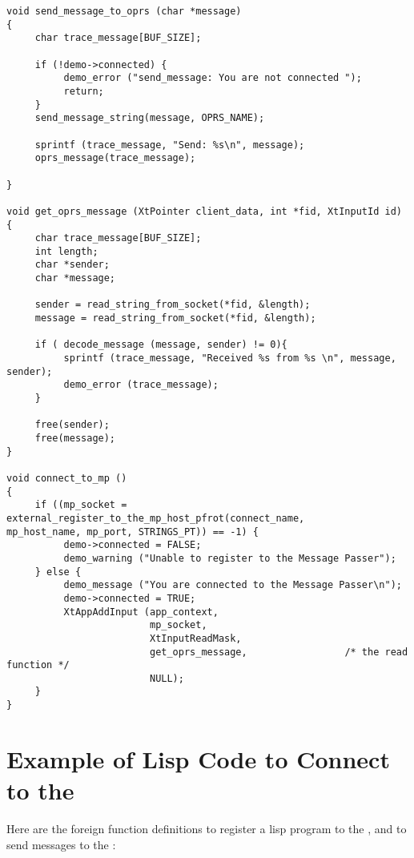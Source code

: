 \begin{verbatim}
void send_message_to_oprs (char *message)
{
     char trace_message[BUF_SIZE];

     if (!demo->connected) {
          demo_error ("send_message: You are not connected ");
          return;
     }
     send_message_string(message, OPRS_NAME);

     sprintf (trace_message, "Send: %s\n", message);
     oprs_message(trace_message);

}

void get_oprs_message (XtPointer client_data, int *fid, XtInputId id)
{
     char trace_message[BUF_SIZE];
     int length;
     char *sender;
     char *message;

     sender = read_string_from_socket(*fid, &length);
     message = read_string_from_socket(*fid, &length);

     if ( decode_message (message, sender) != 0){
          sprintf (trace_message, "Received %s from %s \n", message, sender);
          demo_error (trace_message);
     }

     free(sender);
     free(message);
}

void connect_to_mp ()
{
     if ((mp_socket = external_register_to_the_mp_host_pfrot(connect_name,
mp_host_name, mp_port, STRINGS_PT)) == -1) {
          demo->connected = FALSE;
          demo_warning ("Unable to register to the Message Passer");
     } else {
          demo_message ("You are connected to the Message Passer\n");
          demo->connected = TRUE;
          XtAppAddInput (app_context,
                         mp_socket,
                         XtInputReadMask,
                         get_oprs_message,                 /* the read function */
                         NULL);
     }
}

\end{verbatim}

\section{Example of Lisp Code to Connect to the \MP{}}

Here are the foreign function definitions to register a lisp program to
the \MP{}, and to send messages to the \MP:

